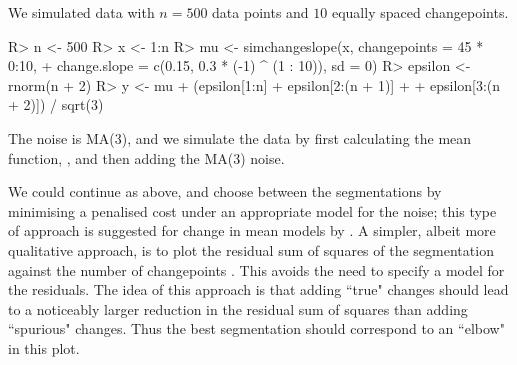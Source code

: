 \documentclass[article]{jss}
\begin{document}
We simulated data with $n=500$ data points and $10$ equally spaced changepoints.
\begin{CodeChunk}
\begin{CodeInput}
R> n <- 500
R> x <- 1:n
R> mu <- simchangeslope(x, changepoints = 45 * 0:10, 
+  change.slope = c(0.15, 0.3 *  (-1) ^ (1 : 10)), sd = 0)
R> epsilon <- rnorm(n + 2)
R> y <- mu + (epsilon[1:n] + epsilon[2:(n + 1)] + 
+             epsilon[3:(n + 2)]) / sqrt(3)
\end{CodeInput}
\end{CodeChunk}
The noise is MA(3), and we simulate the data by first calculating the mean function, , and then adding the MA(3) noise.

We could continue as above, and choose between the segmentations by minimising a penalised cost under an appropriate model for the noise; this type of approach is suggested for change in mean models by \cite{cho2020multiple}. A simpler, albeit more qualitative approach, is to plot the residual sum of squares of the segmentation against the number of changepoints \citep{lebarbier2005detecting,baudry2012slope,fearnhead2020relating,fryzlewicz2020detecting}. This avoids the need to specify a model for the residuals. The idea of this approach is that adding ``true" changes should lead to a noticeably larger reduction in the residual sum of squares than adding ``spurious" changes. Thus the best segmentation should correspond to an ``elbow" in this plot.
\end{document}
